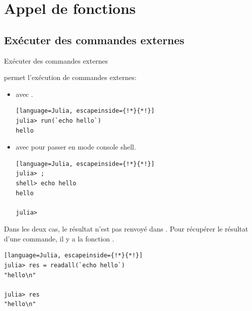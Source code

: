 \section{Appel de fonctions}
\subsection{Exécuter des commandes externes}
\begin{frame}[containsverbatim]{Exécuter des commandes externes}
\par{{\Julia} permet l'exécution de commandes externes:}
\begin{itemize}
\item avec .
\begin{lstlisting}[language=Julia, escapeinside={!*}{*!}]
julia> run(`echo hello`)
hello
\end{lstlisting}
\item avec \cmdb{;} pour passer en mode console shell.
\begin{lstlisting}[language=Julia, escapeinside={!*}{*!}]
julia> ;
shell> echo hello
hello

julia>
\end{lstlisting}
\end{itemize}
\par{Dans les deux cas, le résultat n'est pas renvoyé dans {\Julia}. Pour récupérer le résultat d'une commande, il y a la fonction .}
\begin{lstlisting}[language=Julia, escapeinside={!*}{*!}]
julia> res = readall(`echo hello`)
"hello\n"

julia> res
"hello\n"
\end{lstlisting}
\end{frame}


